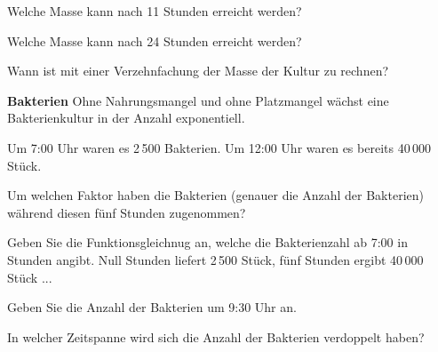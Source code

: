 \begin{bbwAufgabenBlock}

\item Welche Masse kann nach 11 Stunden erreicht werden?

\item Welche Masse kann nach 24 Stunden erreicht werden?

\item Wann ist mit einer Verzehnfachung der Masse der Kultur zu rechnen?


\end{bbwAufgabenBlock}
\platzFuerBerechnungenBisEndeSeite{}






\bbwActAufgabenNr{} \textbf{Bakterien}
 Ohne Nahrungsmangel und ohne Platzmangel wächst eine Bakterienkultur
 in der Anzahl exponentiell.

Um 7:00 Uhr waren es 2\,500 Bakterien.
Um 12:00 Uhr waren es bereits 40\,000 Stück.

\begin{bbwAufgabenBlock}

\item Um welchen Faktor haben die Bakterien (genauer die Anzahl der Bakterien) während diesen fünf
Stunden zugenommen?


\item Geben Sie die Funktionsgleichnug an, welche die Bakterienzahl ab
7:00 in Stunden angibt. Null Stunden liefert 2\,500 Stück, fünf
      Stunden ergibt 40\,000 Stück ...

\item Geben Sie die Anzahl der Bakterien um 9:30 Uhr an.

\item In welcher Zeitspanne wird sich die Anzahl der Bakterien
verdoppelt haben?

\end{bbwAufgabenBlock}
\platzFuerBerechnungenBisEndeSeite{}




